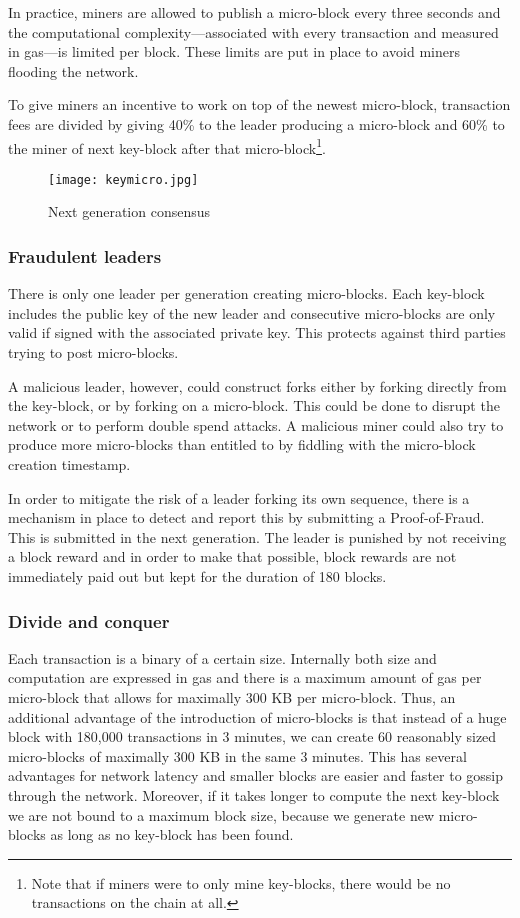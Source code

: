 In practice, miners are allowed to publish a micro-block every three seconds
and the computational complexity---associated with every transaction and
measured in gas---is limited per block. These limits are put in place to avoid
miners flooding the network.

To give miners an incentive to work on top of the newest micro-block,
transaction fees are divided by giving 40\% to the leader producing a
micro-block and 60\% to the miner of next key-block after that
micro-block\footnote{Note that if miners
  were to only mine key-blocks, there would be no transactions on the
  chain at all.}.

\begin{figure}
   \texttt{[image: keymicro.jpg]}
   \caption{Next generation consensus}
   \label{ng-mining}
\end{figure}

\subsubsection{Fraudulent leaders}

There is only one leader per generation creating micro-blocks. Each key-block
includes the public key of the new leader and consecutive micro-blocks are
only valid if signed with the associated private key. This protects
against third parties trying to post micro-blocks.

A malicious leader, however, could construct forks either by forking directly
from the key-block, or by forking on a micro-block. This could be done to
disrupt the network or to perform double spend attacks. A malicious miner could
also try to produce more micro-blocks than entitled to by fiddling with the
micro-block creation timestamp.

In order to mitigate the risk of a leader forking its own sequence,
there is a mechanism in place to detect and report this by submitting
a Proof-of-Fraud. This is submitted in the next
generation. The leader is punished by not receiving a block reward and
in order to make that possible, block rewards are not immediately paid out but
kept for the duration of 180 blocks.

\subsubsection{Divide and conquer}

Each transaction is a binary of a certain size. Internally both size
and computation are expressed in gas and there is a maximum amount of
gas per micro-block that allows for maximally 300 KB per micro-block.
Thus, an additional advantage of the introduction of micro-blocks is that
instead of a huge block with 180,000 transactions in 3 minutes, we can create
60
reasonably sized micro-blocks of maximally 300 KB  in the same 3
minutes. This has several advantages for network latency and
smaller blocks are easier and faster to gossip through the
network. Moreover, if it takes longer to compute the next key-block we
are not bound to a maximum block size, because we generate new
micro-blocks as long as no key-block has been found.

